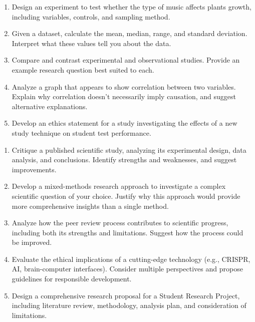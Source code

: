 \documentclass[justified,notoc]{tufte-book}
\newenvironment{tieredquestions}[1]{%
    \begin{tcolorbox}[colback=note!30,colframe=note!50,title=\textbf{Practice Questions - #1}]
}{%
    \end{tcolorbox}
}
\begin{document}
\begin{tieredquestions}{Level 2 - Application}
\begin{enumerate}
    \item Design an experiment to test whether the type of music affects plants growth, including variables, controls, and sampling method.
    \item Given a dataset, calculate the mean, median, range, and standard deviation. Interpret what these values tell you about the data.
    \item Compare and contrast experimental and observational studies. Provide an example research question best suited to each.
    \item Analyze a graph that appears to show correlation between two variables. Explain why correlation doesn't necessarily imply causation, and suggest alternative explanations.
    \item Develop an ethics statement for a study investigating the effects of a new study technique on student test performance.
\end{enumerate}
\end{tieredquestions}

\begin{tieredquestions}{Level 3 - Extension and Analysis}
\begin{enumerate}
    \item Critique a published scientific study, analyzing its experimental design, data analysis, and conclusions. Identify strengths and weaknesses, and suggest improvements.
    \item Develop a mixed-methods research approach to investigate a complex scientific question of your choice. Justify why this approach would provide more comprehensive insights than a single method.
    \item Analyze how the peer review process contributes to scientific progress, including both its strengths and limitations. Suggest how the process could be improved.
    \item Evaluate the ethical implications of a cutting-edge technology (e.g., CRISPR, AI, brain-computer interfaces). Consider multiple perspectives and propose guidelines for responsible development.
    \item Design a comprehensive research proposal for a Student Research Project, including literature review, methodology, analysis plan, and consideration of limitations.
\end{enumerate}
\end{tieredquestions}
\end{document}
